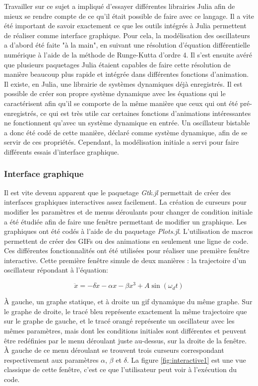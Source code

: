 \documentclass[a4paper, french, 12pt, titlepage]{article}
\begin{document}
Travailler sur ce sujet a impliqué d'essayer différentes librairies Julia afin de mieux se rendre compte de ce qu'il était possible de faire avec ce langage.
Il a vite été important de savoir exactement ce que les outils intégrés à Julia permettent de réaliser comme interface graphique.
Pour cela, la modélisation des oscillateurs a d'abord été faite "à la main", en suivant une résolution d'équation différentielle numérique à l'aide de la méthode de Runge-Kutta d'ordre 4.
Il s'est ensuite avéré que plusieurs paquetages Julia étaient capables de faire cette résolution de manière beaucoup plus rapide et intégrée dans différentes fonctions d'animation.
Il existe, en Julia, une librairie de systèmes dynamiques déjà enregistrés.
Il est possible de créer son propre système dynamique avec les équations qui le caractérisent afin qu'il se comporte de la même manière que ceux qui ont été pré-enregistrés, ce qui est très utile car certaines fonctions d'animations intéressantes ne fonctionnent qu'avec un système dynamique en entrée.
Un oscillateur bistable a donc été codé de cette manière, déclaré comme système dynamique, afin de se servir de ces propriétés.
Cependant, la modélisation initiale a servi pour faire différents essais d'interface graphique.


\subsubsection{Interface graphique}

Il est vite devenu apparent que le paquetage \emph{Gtk.jl} permettait de créer des interfaces graphiques interactives assez facilement.
La création de curseurs pour modifier les paramètres et de menus déroulants pour changer de condition initiale a été étudiée afin de faire une fenêtre permettant de modifier un graphique.
Les graphiques ont été codés à l'aide de du paquetage \emph{Plots.jl}.
L'utilisation de macros permettent de créer des GIFs ou des animations en seulement une ligne de code.
Ces différentes fonctionnalités ont été utilisées pour réaliser une première fenêtre interactive.
Cette première fenêtre simule  de deux manières : la trajectoire d'un oscillateur répondant à l'équation:

\begin{equation}
  \ddot x = - \delta  \dot x - \alpha  x - \beta  x^3 + A \sin(\omega_d t)
\end{equation}

\noindent \`A gauche, un graphe statique, et à droite un gif dynamique du même graphe.
Sur le graphe de droite, le tracé bleu représente exactement la même trajectoire que sur le graphe de gauche, et le tracé orangé représente un oscillateur avec les mêmes paramètres,
mais dont les conditions initiales sont différentes et peuvent être redéfinies par le menu déroulant juste au-dessus, sur la droite de la fenêtre.
À gauche de ce menu déroulant se trouvent trois curseurs correspondant respectivement aux paramètres $\alpha$, $\beta$ et $\delta$. 
La figure \ref{fig:interactive1} est une vue classique de cette fenêtre, c'est ce que l'utilisateur peut voir à l'exécution du code.
\end{document}
